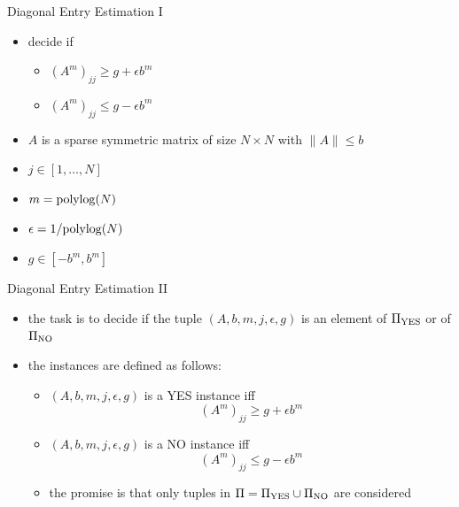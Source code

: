 \documentclass[slideColor]{prosper}
\renewcommand{\>}{\rangle}
\newcommand{\<}{\langle}
\begin{document}
\begin{slide}{Diagonal Entry Estimation I}
\begin{itemize}
\item decide if

\medskip
\begin{itemize}
\item $(A^m)_{jj} \ge g + \epsilon b^m$ 

\medskip
\item $(A^m)_{jj} \le g - \epsilon b^m$
\end{itemize}

\medskip
\item $A$ is a sparse symmetric matrix of size $N\times N$ with $\|A\| \le b$ 

\medskip 
\item $j\in [1,\ldots,N]$

\medskip
\item $m={\rm polylog}(N)$

\medskip
\item 
$\epsilon=1/{\rm polylog}(N)$

\medskip
\item $g\in[-b^m,b^m]$
\end{itemize}
\end{slide}


\begin{slide}{Diagonal Entry Estimation II}
\begin{itemize}
\item the task is to decide if the tuple $(A,b,m,j,\epsilon,g)$ is an element of $\Pi_{\rm YES}$ or of $\Pi_{\rm NO}$

\medskip
\item the instances are defined as follows:

\medskip
\begin{itemize}
\item $(A,b,m,j,\epsilon,g)$ is a YES instance iff
\[
(A^m)_{jj} \ge g + \epsilon b^m
\]

\medskip
\item $(A,b,m,j,\epsilon,g)$ is a NO instance iff
\[
(A^m)_{jj} \le g - \epsilon b^m
\]

\medskip
\item the promise is that only tuples in $\Pi=\Pi_{\rm YES} \cup \Pi_{\rm NO}$ are considered
\end{itemize}
\end{itemize}
\end{slide}
\end{document}
